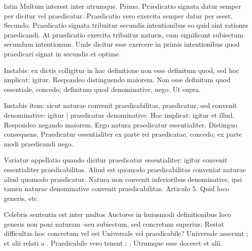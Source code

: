 \begin{otherlanguage*}{latin}
\pstart
Multum interest inter utrumque. Primo. Praedicatio signata datur semper per dicitur vel praedicatur. Praedicatio vero exercita semper datur per seest. Secundo. Praedicatio signata tribuitur secundis intentionibus eo quid sint rationes praedicandi. At praedicatio exercita tribuitur naturis, cum significant subiectum secundum intentionum. Unde dicitur esse exercere in primis intentionibus quod praedicari signat in secundis et optime. 
\pend

\pstart
Instabis:
ex dictis colligitur in hac definitione non esse definitum quod, sed hoc implicat:
igitur. Respondeo distinguendo maiorem. Non esse definitum quod essentiale, concedo; definitum quod denominative, nego. Ut supra. 
\pend

\pstart
Instabis item:
sicut naturae convenit praedicabilitas, praedicatur, sed convenit denominative:
igitur \textnormal{|} praedicatur denominative. Hoc implicat:
igitur et illud. Respondeo negando maiorem. Ergo natura praedicatur essentialiter. Distinguo consequens. Praedicatur essentialiter ex parte rei praedicatae, concedo; ex parte modi praedicandi nego. 
\pend

\pstart
Variatur appellatio quando dicitur praedicatur essentialiter:
igitur convenit essentialiter praedicabilitas. Aliud est quomodo praedicabilitas conveniat naturae aliud quomodo praedicatur. Natura non convenit inferioribus denominative, ipsi tamen naturae denominative convenit praedicabilitas. Articulo 5. Quid loco generis, etc. 
\pend

\pstart
{}
\pend

\pstart
Celebris sententia est inter multos Auctores in huiusmodi definitionibus loco generis non poni naturam -seu subiectum, sed concretum superius. Restat difficultas hoc concretum vel est Universale vel praedicabile? Universale asserunt ;  et alii relati a . Praedicabile vero tenent ; . Utrumque esse doceret  et alii. 
\pend


\end{otherlanguage*}
